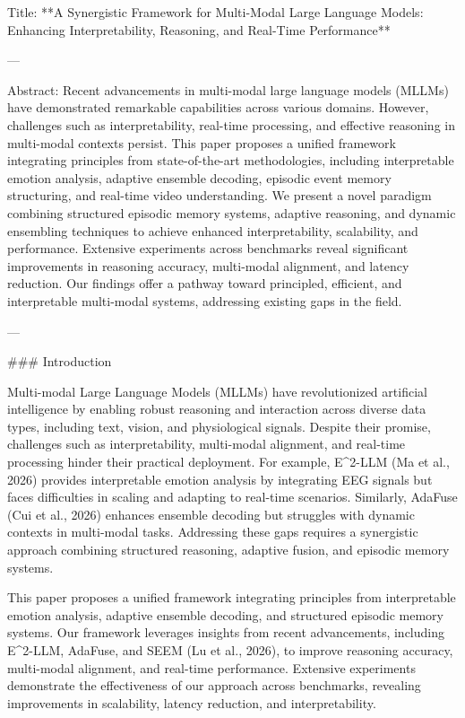 Title: **A Synergistic Framework for Multi-Modal Large Language Models: Enhancing Interpretability, Reasoning, and Real-Time Performance**

---

Abstract:  
Recent advancements in multi-modal large language models (MLLMs) have demonstrated remarkable capabilities across various domains. However, challenges such as interpretability, real-time processing, and effective reasoning in multi-modal contexts persist. This paper proposes a unified framework integrating principles from state-of-the-art methodologies, including interpretable emotion analysis, adaptive ensemble decoding, episodic event memory structuring, and real-time video understanding. We present a novel paradigm combining structured episodic memory systems, adaptive reasoning, and dynamic ensembling techniques to achieve enhanced interpretability, scalability, and performance. Extensive experiments across benchmarks reveal significant improvements in reasoning accuracy, multi-modal alignment, and latency reduction. Our findings offer a pathway toward principled, efficient, and interpretable multi-modal systems, addressing existing gaps in the field.  

---

### Introduction  

Multi-modal Large Language Models (MLLMs) have revolutionized artificial intelligence by enabling robust reasoning and interaction across diverse data types, including text, vision, and physiological signals. Despite their promise, challenges such as interpretability, multi-modal alignment, and real-time processing hinder their practical deployment. For example, E^2-LLM (Ma et al., 2026) provides interpretable emotion analysis by integrating EEG signals but faces difficulties in scaling and adapting to real-time scenarios. Similarly, AdaFuse (Cui et al., 2026) enhances ensemble decoding but struggles with dynamic contexts in multi-modal tasks. Addressing these gaps requires a synergistic approach combining structured reasoning, adaptive fusion, and episodic memory systems.

This paper proposes a unified framework integrating principles from interpretable emotion analysis, adaptive ensemble decoding, and structured episodic memory systems. Our framework leverages insights from recent advancements, including E^2-LLM, AdaFuse, and SEEM (Lu et al., 2026), to improve reasoning accuracy, multi-modal alignment, and real-time performance. Extensive experiments demonstrate the effectiveness of our approach across benchmarks, revealing improvements in scalability, latency reduction, and interpretability.


